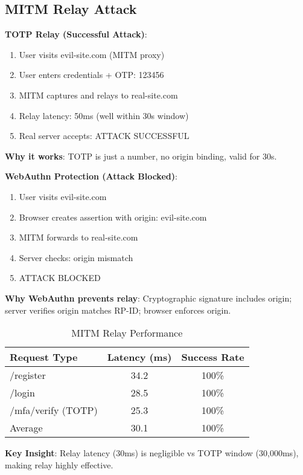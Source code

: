 \documentclass[12pt,a4paper]{article}
\begin{document}
\subsection{MITM Relay Attack}

\textbf{TOTP Relay (Successful Attack)}:
\begin{enumerate}
\item User visits evil-site.com (MITM proxy)
\item User enters credentials + OTP: 123456
\item MITM captures and relays to real-site.com
\item Relay latency: 50ms (well within 30s window)
\item Real server accepts: ATTACK SUCCESSFUL
\end{enumerate}

\textbf{Why it works}: TOTP is just a number, no origin binding, valid for 30s.

\textbf{WebAuthn Protection (Attack Blocked)}:
\begin{enumerate}
\item User visits evil-site.com
\item Browser creates assertion with origin: evil-site.com
\item MITM forwards to real-site.com
\item Server checks: origin mismatch
\item ATTACK BLOCKED
\end{enumerate}

\textbf{Why WebAuthn prevents relay}: Cryptographic signature includes origin; server verifies origin matches RP-ID; browser enforces origin.

\begin{table}[H]
\centering
\begin{tabular}{lcc}
\toprule
Request Type & Latency (ms) & Success Rate \\
\midrule
/register & 34.2 & 100\% \\
/login & 28.5 & 100\% \\
/mfa/verify (TOTP) & 25.3 & 100\% \\
Average & 30.1 & 100\% \\
\bottomrule
\end{tabular}
\caption{MITM Relay Performance}
\end{table}

\textbf{Key Insight}: Relay latency (30ms) is negligible vs TOTP window (30,000ms), making relay highly effective.
\end{document}
